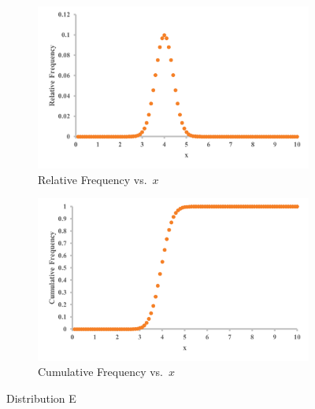 \documentclass[12pt]{article}
\begin{document}
\begin{figure}[h!]
    \centering
    \begin{subfigure}[b]{0.45\textwidth}
        \includegraphics[width=\textwidth]{graphs/DistE_Rel.png}
        \caption{Relative Frequency vs.\ \(x\)}
    \end{subfigure}
    \hfill
    \begin{subfigure}[b]{0.45\textwidth}
        \includegraphics[width=\textwidth]{graphs/DistE_Cumul.png}
        \caption{Cumulative Frequency vs.\ \(x\)}
    \end{subfigure}
    \label{fig:distE}
    \caption{Distribution E}
\end{figure}
\end{document}
